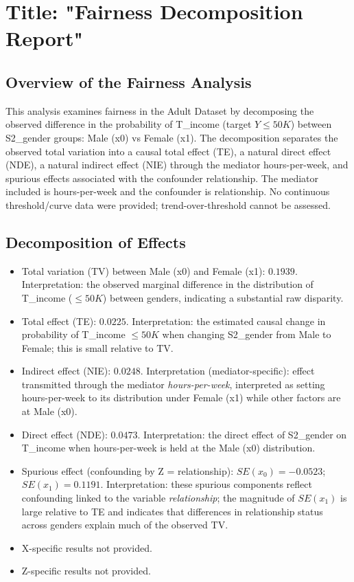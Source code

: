 \documentclass{article}
\begin{document}
\section*{Title: "Fairness Decomposition Report"}

\subsection*{Overview of the Fairness Analysis}
This analysis examines fairness in the Adult Dataset by decomposing the observed difference in the probability of T\_income (target $Y \leq 50K$) between S2\_gender groups: Male (x0) vs Female (x1). The decomposition separates the observed total variation into a causal total effect (TE), a natural direct effect (NDE), a natural indirect effect (NIE) through the mediator hours-per-week, and spurious effects associated with the confounder relationship. The mediator included is hours-per-week and the confounder is relationship. No continuous threshold/curve data were provided; trend-over-threshold cannot be assessed.

\subsection*{Decomposition of Effects}
\begin{itemize}
\item Total variation (TV) between Male (x0) and Female (x1): $0.1939$. Interpretation: the observed marginal difference in the distribution of T\_income ($\leq 50K$) between genders, indicating a substantial raw disparity.
\item Total effect (TE): $0.0225$. Interpretation: the estimated causal change in probability of T\_income $\leq 50K$ when changing S2\_gender from Male to Female; this is small relative to TV.
\item Indirect effect (NIE): $0.0248$. Interpretation (mediator-specific): effect transmitted through the mediator \emph{hours-per-week}, interpreted as setting hours-per-week to its distribution under Female (x1) while other factors are at Male (x0).
\item Direct effect (NDE): $0.0473$. Interpretation: the direct effect of S2\_gender on T\_income when hours-per-week is held at the Male (x0) distribution.
\item Spurious effect (confounding by Z = relationship): $SE(x_0) = -0.0523$; $SE(x_1) = 0.1191$. Interpretation: these spurious components reflect confounding linked to the variable \emph{relationship}; the magnitude of $SE(x_1)$ is large relative to TE and indicates that differences in relationship status across genders explain much of the observed TV.
\item X-specific results not provided.
\item Z-specific results not provided.
\end{itemize}
\end{document}
